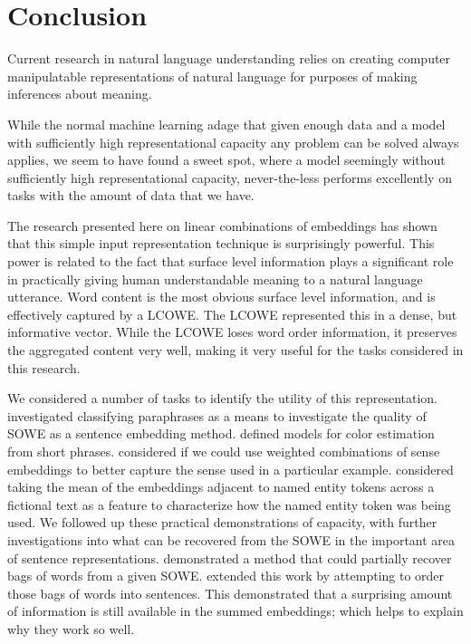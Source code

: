 \documentclass{book}
\begin{document}
\chapter{Conclusion}
Current research in natural language understanding relies on creating computer manipulatable representations of natural language for purposes of making inferences about meaning.


While the normal machine learning adage that given enough data and a model with sufficiently high representational capacity any problem can be solved always applies,
we seem to have found a sweet spot, 
where a model seemingly without sufficiently high representational capacity,
never-the-less performs excellently on tasks with the amount of data that we have.


The research presented here on linear combinations of embeddings has shown that this simple input representation technique is surprisingly powerful.
This  power is related to the fact that surface level information plays a significant role in practically giving human understandable meaning to a natural language utterance.
Word content is the most obvious surface level information, and is effectively captured by a LCOWE.
The LCOWE represented this in a dense, but informative vector.
While the LCOWE loses word order information, it preserves the aggregated content very well,
making it very useful for the tasks considered in this research.


We considered a number of tasks to identify the utility of this representation.
 investigated classifying paraphrases as a means to investigate the quality of SOWE as a sentence embedding method.
 defined models for color estimation from short phrases.
 considered if we could use weighted combinations of sense embeddings to better capture the sense used in a particular example.
 considered taking the mean of the embeddings adjacent to named entity tokens across a fictional text as a feature to characterize how the named entity token was being used.
We followed up these practical demonstrations of capacity,
with further investigations into what can be recovered from the SOWE in the important area of sentence representations.
 demonstrated a method that could partially recover bags of words from a given SOWE.
 extended this work by attempting to order those bags of words into sentences.
This demonstrated that a surprising amount of information is still available in the summed embeddings; which helps to explain why they work so well.
\end{document}
